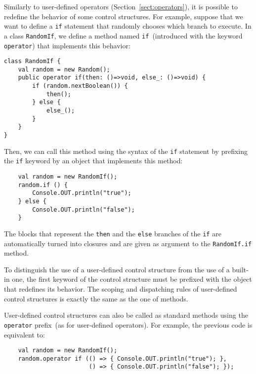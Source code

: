 Similarly to user-defined operators (Section~\ref{sect:operators}), it is possible to redefine the
behavior of some control structures.
%
For example, suppose that we want to define a \verb+if+ statement that
randomly chooses which branch to execute. In a class \verb+RandomIf+,
we define a method named \verb+if+~(introduced with the keyword
\verb+operator+) that implements this behavior:
\begin{verbatim}
class RandomIf {
    val random = new Random();
    public operator if(then: ()=>void, else_: ()=>void) {
        if (random.nextBoolean()) {
            then();
        } else {
            else_();
        }
    }
}
\end{verbatim}
Then, we can call this method using the syntax of the \verb+if+
statement by prefixing the \verb+if+ keyword by an object that
implements this method:
\begin{verbatim}
    val random = new RandomIf();
    random.if () {
        Console.OUT.println("true");
    } else {
        Console.OUT.println("false");
    }
\end{verbatim}
The blocks that represent the \verb+then+ and the \verb+else+ branches
of the \verb+if+ are automatically turned into closures and are given
as argument to the \verb+RandomIf.if+ method.

To distinguish the use of a user-defined control structure from the
use of a built-in one, the first keyword of the control structure must
be prefixed with the object that redefines its behavior.
%
The scoping and dispatching rules of user-defined control structures
is exactly the same as the one of methods.


User-defined control structures can also be called as standard methods
using the \verb+operator+ prefix~(as for user-defined operators). For
example, the previous code is equivalent to:
\begin{verbatim}
    val random = new RandomIf();
    random.operator if (() => { Console.OUT.println("true"); },
                        () => { Console.OUT.println("false"); });
\end{verbatim}


